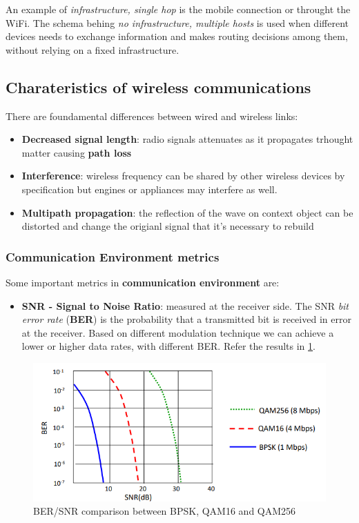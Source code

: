\documentclass[10pt,a4paper]{report}
\theoremstyle{definition}
\begin{document}
An example of \textit{infrastructure, single hop} is the mobile connection or throught the WiFi.
The schema behing \textit{no infrastructure, multiple hosts} is used when different devices needs to exchange information and makes routing decisions among them, without relying on a fixed infrastructure.
\subsection{Charateristics of wireless communications}\label{sec:charateristics-of-wireless-communications}
There are foundamental differences between wired and wireless links:
\begin{itemize}
	\item 
	\textbf{Decreased signal length}: radio signals attenuates as it propagates trhought matter causing \textbf{path loss}
	\item 
	\textbf{Interference}: wireless frequency can be shared by other wireless devices by specification but engines or appliances may interfere as well.
	\item 
	\textbf{Multipath propagation}: the reflection of the wave on context object can be distorted and change the origianl signal that it's necessary to rebuild
\end{itemize}
\subsubsection{Communication Environment metrics}\label{sec:communication-environment-metrics}
Some important metrics in \textbf{communication environment} are:
\begin{itemize}
	\item 
	\textbf{SNR - Signal to Noise Ratio}: measured at the receiver side. The SNR \textit{bit error rate} (\textbf{BER}) is the probability that a transmitted bit is received in error at the receiver. Based on different modulation technique we can achieve a lower or higher data rates, with different BER. Refer the results in \ref{SNR-BER}.


\end{itemize}
	\begin{figure}[h]
	\centering\includegraphics[scale=0.50]{images/Pasted image 20230225093643.png}
	\caption{BER/SNR comparison between BPSK, QAM16 and QAM256}
	\label{SNR-BER}	
\end{figure}
\end{document}
